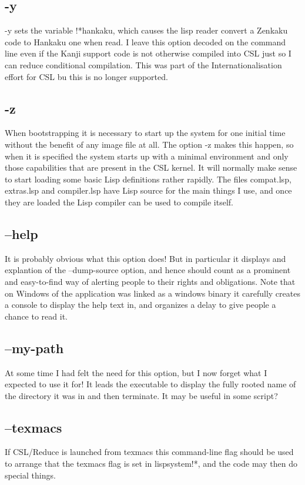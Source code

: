 \documentclass[a4paper,11pt]{article}
\begin{document}
\subsection{\ttfamily -y}
{\ttfamily -y } sets the variable {\ttfamily !*hankaku}, which causes the
lisp reader convert a Zenkaku code to Hankaku one when read. I leave this
option decoded on the command line even if the Kanji support code is not
otherwise compiled into CSL just so I can reduce conditional compilation.
This was part of the Internationalisation effort for CSL bu this is no longer
supported. 
\subsection{\ttfamily -z}
When bootstrapping it is necessary to start up the system for one initial time
without the benefit of any image file at all. The option {\ttfamily -z} makes
this happen, so when it is specified the system starts up with a minimal
environment and only those capabilities that are present in the CSL
kernel. It will normally make sense to start loading some basic Lisp
definitions rather rapidly. The files {\ttfamily compat.lsp},
{\ttfamily extras.lsp} and {\ttfamily compiler.lsp} have Lisp source for the
main things I use, and once they are loaded the Lisp compiler can be used
to compile itself.
\subsection{\ttfamily --help}
It is probably obvious what this option does! But in particular it displays
and explantion of the {\ttfamily --dump-source} option, and hence should
count as a prominent and easy-to-find way of alerting people to their rights
and obligations. Note that on Windows of the application was linked as a
windows binary it carefully creates a console to display the help text
in, and organizes a delay to give people a chance to read it.
\subsection{\ttfamily --my-path}
At some time I had felt the need for this option, but I now forget what I
expected to use it for! It leads the executable to display the fully
rooted name of the directory it was in and then terminate. It may be useful
in some script?
\subsection{\ttfamily --texmacs}
If CSL/Reduce is launched from texmacs this command-line flag should be
used to arrange that the {\ttfamily texmacs} flag is set in
{\ttfamily lispsystem!*}, and the code may then do special things.
\end{document}
